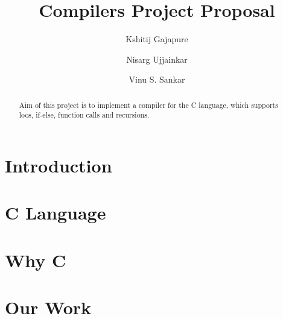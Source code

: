 \documentclass{clv3}
\author{Kshitij Gajapure}
\affil{16110055}
\author{Nisarg Ujjainkar}
\affil{16110102}
\author{Vinu S. Sankar}
\affil{16110143}
\title{Compilers Project Proposal}
\begin{document}
    \maketitle  
    \begin{abstract}
        Aim of this project is to implement a compiler for the 
        C language, which supports loos, if-else, function calls 
        and recursions.
    \end{abstract}
    \section{Introduction}
    
    \section{C Language}
    
    \section{Why C}
    
    \section{Our Work}
    
\end{document}
